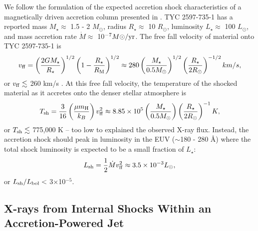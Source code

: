 \documentclass[linenumbers]{aastex631}
\begin{document}
We follow the formulation of the expected accretion shock characteristics of a magnetically driven accretion column presented in \citet{2007A&A...466.1111G }. TYC 2597-735-1 has a reported mass $M_{\star} \approx$ 1.5 - 2 $M_{\odot}$, radius $R_{\star} \approx$ 10 $R_{\odot}$, luminosity $L_{\star} \approx$ 100 $L_{\odot}$, and mass accretion rate $\dot{M} \approx$ 10$^{-7} M{\odot}/{\rm yr}$. The free fall velocity of material onto TYC 2597-735-1 is 
\begin{equation}
    v_{\rm ff} = \left( \frac{2 G M_{\star}}{R_{\star}} \right)^{1/2} \left( 1 - \frac{R_{\star}}{R_{\rm M}} \right)^{1/2} \approx 280 \left( \frac{M_{\star}}{0.5 M_{\odot}} \right)^{1/2} \left( \frac{R_{\star}}{2 R_{\odot}} \right)^{-1/2} km/s,
\end{equation}
or $v_{\rm ff} \lesssim$ 260 km/s \citep{2020Natur.587..387H}. At this free fall velocity, the temperature of the shocked material as it accretes onto the denser stellar atmosphere is  
\begin{equation}
    T_{\rm sh} = \frac{3}{16} \left( \frac{\mu m_{\rm H}}{k_{B}} \right) v_{\rm ff}^{2} \approx 8.85 \times 10^{5} \left( \frac{M_{\star}}{0.5 M_{\odot}} \right) \left( \frac{R_{\star}}{2 R_{\odot}} \right)^{-1} K,
\end{equation}
or $T_{\rm sh} \lesssim$ 775,000 K -- too low to explained the observed X-ray flux.
Instead, the accretion shock should peak in luminosity in the EUV ($\sim$180 - 280 {\AA}) where the total shock luminosity is expected to be a small fraction of $L_{\star}$:
\begin{equation}
    L_{\rm sh} = \frac{1}{2} \dot{M} v_{\rm ff}^{2} \approx 3.5 \times 10^{-3} L_{\odot},
\end{equation}
or $L_{\rm sh}/L_{\rm bol} <$ 3$\times$10$^{-5}$.


\subsection{X-rays from Internal Shocks Within an Accretion-Powered Jet}
\end{document}
